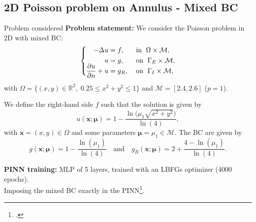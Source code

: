 \subsection{2D Poisson problem on Annulus - Mixed BC}

\begin{frame}{Problem considered} 
	\textbf{Problem statement:} We consider the Poisson problem in 2D with mixed BC:
	\vspace{-5pt}
	\begin{equation*}
		\left\{
		\begin{aligned}
			-\Delta u & = f, \; &  & \text{in } \; \Omega \times \mathcal{M}, \\
			u         & = g, \;  &  & \text{on } \; \Gamma_E \times \mathcal{M}, \\
			\smash{\frac{\partial u}{\partial n}}+u  & = g_R, \;  &  & \text{on } \; \Gamma_I \times \mathcal{M},
		\end{aligned}
		\right.
	\end{equation*}

	with $\Omega=\{(x,y)\in\mathbb{R}^2, \; 0.25\le x^2+y^2\le 1\}$ and $\mathcal{M}=[2.4,2.6]$ ($p=1$).
		
	\vspace{8pt}
	We define the right-hand side $f$ such that the solution is given by
	\vspace{-5pt}
	\begin{equation*}
		u(\bm{x};\bm{\mu})= 1 - \frac{\ln\big(\mu_1\sqrt{x^2+y^2}\big)}{\ln(4)},
	\end{equation*}
	\vspace{-5pt}
	with $\bm{x}=(x,y)\in\Omega$ and some parameters $\bm{\mu}=\mu_1 \in \mathcal{M}$. The BC are given by
	\begin{equation*}
		g(\bm{x};\bm{\mu})=1 - \frac{\ln(\mu_1)}{\ln(4)} \quad \text{and} \quad g_R(\bm{x};\bm{\mu})=2 + \frac{4-\ln(\mu_1)}{\ln(4)}.
	\end{equation*}

	\vspace{2pt}
	\textbf{PINN training:} MLP of 5 layers, trained with an LBFGs optimizer (4000 epochs). \\
	Imposing the mixed BC exactly in the PINN\footcite{Sukumar_2022}.

	\vspace{8pt}
\end{frame}

